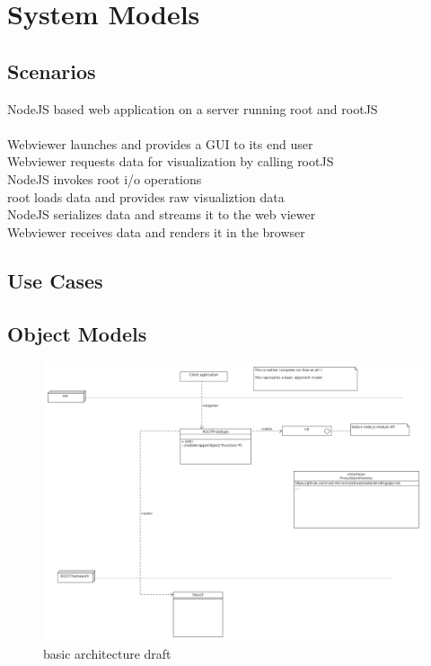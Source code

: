 \chapter{System Models}

\section{Scenarios}
NodeJS based web application on a server running root and rootJS\\
\\
Webviewer launches and provides a GUI to its end user	\\
Webviewer requests data for visualization by calling rootJS\\
\indent	NodeJS invokes root i/o operations\\
\indent \indent		root loads data and provides raw visualiztion data\\
\indent	NodeJS serializes data and streams it to the web viewer\\
Webviewer receives data and renders it in the browser\\
\section{Use Cases}

\pagebreak[4]

\section{Object Models}
\begin{figure}[htb]
	\centering
	\includegraphics[width=18cm]{./latex/resources/architecture.png}
	\caption{basic architecture draft}
\end{figure}

